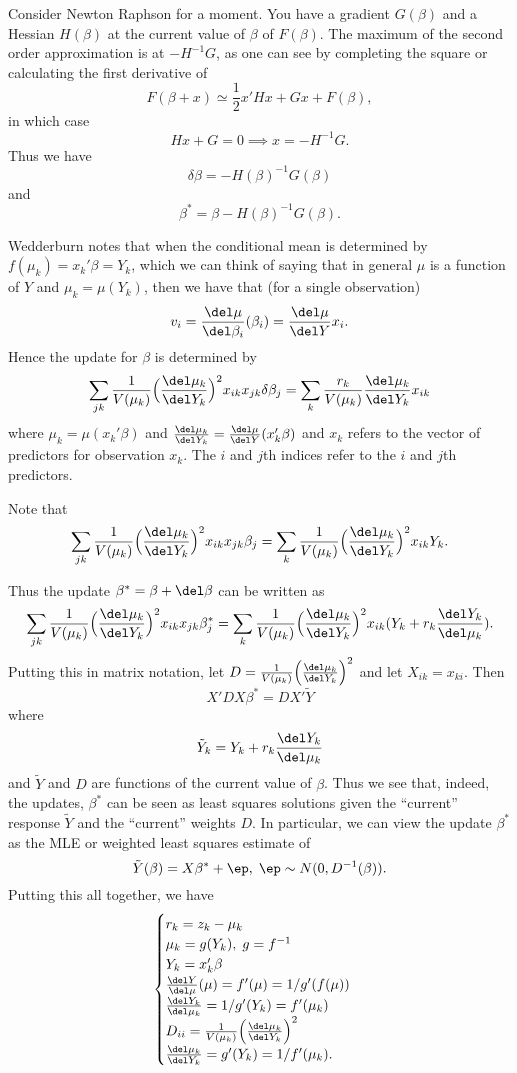 \documentclass{article}
\newcommand{\graddel}[2]{\frac{\del #1}{\del #2}}
\begin{document}
Consider Newton Raphson for a moment.  You have a gradient $G(\beta)$ and a
Hessian $H(\beta)$ at the current value of $\beta$ of $F(\beta)$.  The maximum
of the second order approximation is at $-H^{-1} G$, as one can see by
completing the square or calculating the first derivative of
\[
F(\beta + x) \simeq \frac{1}{2} x' H x + G x + F(\beta),
\]
in which case
\[
Hx + G = 0 \implies x = - H^{-1} G.
\]
Thus we have
\[
\delta \beta = - H(\beta)^{-1} G(\beta)
\]
and
\[
\beta^* = \beta - H(\beta)^{-1} G(\beta).
\]

Wedderburn notes that when the conditional mean is determined by $f(\mu_k) =
x_k' \beta = Y_k$, which we can think of saying that in general $\mu$ is a
function of $Y$ and $\mu_k = \mu(Y_k)$, then we have that (for a single
observation)
\[
v_i = \graddel{\mu}{\beta_i}(\beta_i) = \graddel{\mu}{Y} x_i .
\]
Hence the update for $\beta$ is determined by
\[
\sum_{jk} \frac{1}{V(\mu_k)} \Big(\graddel{\mu_k}{Y_k}\Big)^2 x_{ik} x_{jk} \delta
\beta_j
= \sum_{k} \frac{r_k}{V(\mu_k)}\graddel{\mu_k}{Y_k} x_{ik}
\]
where $\mu_k = \mu(x_k' \beta)$ and $\graddel{\mu_k}{Y_k} =
\graddel{\mu}{Y}(x_k' \beta)$ and $x_k$ refers to the vector of predictors for
observation $x_k$.  The $i$ and $j$th indices refer to the $i$ and $j$th
predictors.

Note that 
\[
\sum_{jk} \frac{1}{V(\mu_k)} \Big(\graddel{\mu_k}{Y_k}\Big)^2 x_{ik} x_{jk}
\beta_j = 
\sum_{k} \frac{1}{V(\mu_k)} \Big(\graddel{\mu_k}{Y_k}\Big)^2 x_{ik} Y_k.
\]

Thus the update $\beta^* = \beta + \del \beta$ can be written as
\[
\sum_{jk} \frac{1}{V(\mu_k)} \Big(\graddel{\mu_k}{Y_k}\Big)^2 x_{ik} x_{jk} 
\beta_j^*
=
\sum_{k} \frac{1}{V(\mu_k)}\Big(\graddel{\mu_k}{Y_k} \Big)^2  x_{ik} (Y_k + r_{k} 
\frac{\del Y_k}{\del \mu_k}).
\]
Putting this in matrix notation, let $D =
\frac{1}{V(\mu_k)}\Big(\graddel{\mu_k}{Y_k} \Big)^2$ and let $X_{ik} = x_{ki}$.
Then
\[
X' D X \beta^* = D X' \tilde Y
\]
where
\[
\tilde Y_k = Y_k + r_k \graddel{Y_k}{\mu_k}
\]
and $\tilde Y$ and $D$ are functions of the current value of $\beta$.  Thus we
see that, indeed, the updates, $\beta^*$ can be seen as least squares solutions
given the ``current'' response $\tilde Y$ and the ``current'' weights $D$.  In
particular, we can view the update $\beta^*$ as the MLE or weighted least
squares estimate of
\[
\tilde Y(\beta) = X \beta^* + \ep, \; \ep \sim N(0, D^{-1}(\beta)).
\]
Putting this all together, we have
\[
\begin{cases}
  r_k = z_k - \mu_k \\
  \mu_k = g(Y_k), \; g = f^{-1} \\
  Y_k = x_k' \beta \\
  \graddel{Y}{\mu}(\mu) = f'(\mu) = 1/g'(f(\mu)) \\
  \graddel{Y_k}{\mu_k} = 1/g'(Y_k) = f'(\mu_k) \\
  D_{ii} = \frac{1}{V(\mu_k)}\Big(\graddel{\mu_k}{Y_k} \Big)^2 \\
  \graddel{\mu_k}{Y_k} = g'(Y_k) = 1/f'(\mu_k).
\end{cases}
\]
\end{document}
